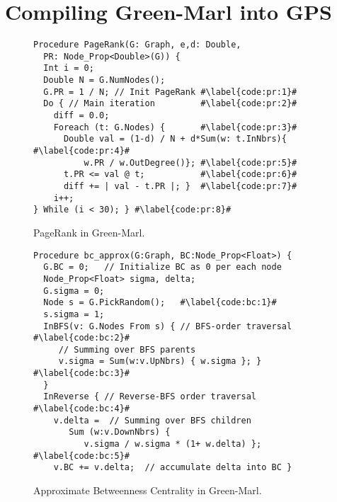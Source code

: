 \section{Compiling Green-Marl into GPS}
\label{sec:green-marl}

\begin{figure}[!t]
\begin{lstlisting}
Procedure PageRank(G: Graph, e,d: Double, 
  PR: Node_Prop<Double>(G)) {
  Int i = 0;
  Double N = G.NumNodes();
  G.PR = 1 / N; // Init PageRank #\label{code:pr:1}#
  Do { // Main iteration         #\label{code:pr:2}#
    diff = 0.0;
    Foreach (t: G.Nodes) {       #\label{code:pr:3}#
      Double val = (1-d) / N + d*Sum(w: t.InNbrs){ #\label{code:pr:4}#
          w.PR / w.OutDegree()}; #\label{code:pr:5}#
      t.PR <= val @ t;           #\label{code:pr:6}#
      diff += | val - t.PR |; }  #\label{code:pr:7}#
    i++;
} While (i < 30); } #\label{code:pr:8}#
\end{lstlisting}
    \vspace{-5pt}
\caption{PageRank in Green-Marl.}
 \label{fig:pr_greenmarl}
\end{figure}

\begin{comment}
\begin{figure}[t]
\begin{lstlisting}
Procedure PageRank(G: Graph, e,d: Double, 
  PR: Node_Prop<Double>(G)) {
  Int i = 0;
  Double N = G.NumNodes();
  G.PR = 1 / N; // Init PageRank #\label{code:pr:1}#
  Do { // Main iteration         #\label{code:pr:2}#
    diff = 0.0;
    Foreach (t: G.Nodes) {       #\label{code:pr:3}#
      Double val = (1-d) / N + d*Sum(w: t.InNbrs){ #\label{code:pr:4}#
          w.PR / w.OutDegree()}; #\label{code:pr:5}#
      t.PR <= val @ t;           #\label{code:pr:6}#
      diff += | val - t.PR |; }  #\label{code:pr:7}#
    i++;
} While (i < 30); } #\label{code:pr:8}#
\end{lstlisting}
    \vspace{-10pt}
\caption{PageRank in Green-Marl.}
 \label{fig:pr_greenmarl}
\end{figure}
\end{comment}

\begin{figure}[!t]
\begin{lstlisting}
Procedure bc_approx(G:Graph, BC:Node_Prop<Float>) {
  G.BC = 0;   // Initialize BC as 0 per each node
  Node_Prop<Float> sigma, delta;
  G.sigma = 0;
  Node s = G.PickRandom();   #\label{code:bc:1}# 
  s.sigma = 1;
  InBFS(v: G.Nodes From s) { // BFS-order traversal #\label{code:bc:2}#
     // Summing over BFS parents
     v.sigma = Sum(w:v.UpNbrs) { w.sigma }; } #\label{code:bc:3}#
  }
  InReverse { // Reverse-BFS order traversal  #\label{code:bc:4}#
    v.delta =  // Summing over BFS children   
       Sum (w:v.DownNbrs) {                   
          v.sigma / w.sigma * (1+ w.delta) }; #\label{code:bc:5}#
    v.BC += v.delta;  // accumulate delta into BC }
\end{lstlisting}
    \vspace{-5pt}
\caption{Approximate Betweenness Centrality in Green-Marl.}
 \label{fig:bc_greenmarl}
\end{figure}

